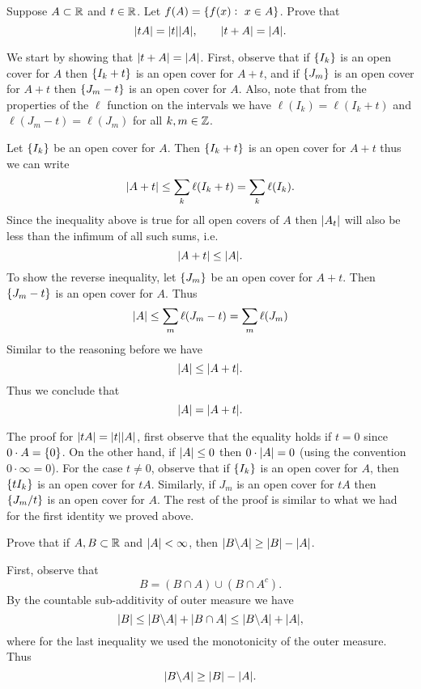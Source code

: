 \begin{problem}
	Suppose $ A \subset\mathbb{R} $ and $ t\in \mathbb{R} $. Let $ f(A) = \{f(x):\ x \in A\} $. Prove that 
	\[ |t A| = |t| |A|, \qquad |t + A| = |A|. \]
\end{problem}
\begin{solution}
	We start by showing that $ |t + A| = |A| $. First, observe that if $ \{I_k\} $ is an open cover for $ A $ then $ \{I_k + t\} $ is an open cover for $ A + t $, and if $ \{J_m\}$ is an open cover for $ A+t $ then $ \{J_m - t\} $ is an open cover for $ A $. Also, note that from the properties of the $ \ell $ function on the intervals we have $ \ell(I_k) = \ell(I_k + t) $ and $ \ell(J_m-t) = \ell(J_m) $ for all $ k,m \in \mathbb{Z} $.
	
	Let $ \{I_k\} $ be an open cover for $ A $. Then $ \{I_k + t\} $ is an open cover for $ A + t $ thus we can write
	\[ |A+t| \leq \sum_k \ell(I_k + t) = \sum_k \ell(I_k). \]
	Since the inequality above is true for all open covers of $ A $ then $ |A_t| $ will also be less than the infimum of all such sums, i.e.
	\[ |A+t| \leq |A|. \] 
	To show the reverse inequality, let $ \{J_m\} $ be an open cover for $ A+t $. Then $ \{J_m-t\}$ is an open cover for $ A $. Thus
	\[ |A| \leq \sum_m \ell(J_m - t) = \sum_m \ell(J_m) \]
	Similar to the reasoning before we have
	\[ |A| \leq |A + t|. \]
	Thus we conclude that 
	\[ |A| = |A +t|. \]
	
	
	The proof for $ |t A| = |t| |A| $, first observe that the equality holds if $ t=0 $ since $ 0 \cdot A = \{0\} $. On the other hand, if $ |A|\leq 0 $ then $ 0 \cdot|A| = 0 $ (using the convention $ 0\cdot\infty=0 $). For the case $ t\neq 0 $, observe that if $ \{I_k\} $ is an open cover for $ A $, then $ \{t I_k\} $ is an open cover for $ t A $. Similarly, if $ J_m $ is an open cover for $ tA $ then $ \{J_m/t\} $ is an open cover for $ A $. The rest of the proof is similar to what we had for the first identity we proved above.
\end{solution}

\begin{problem}
	Prove that if $ A,B \subset \mathbb{R} $ and $ |A| < \infty $, then $ |B \backslash A| \geq |B| - |A| $.
\end{problem}
\begin{solution}
	First, observe that 
	\[ B = (B\cap A) \cup (B\cap A^c). \]
	By the countable sub-additivity of outer measure we have
	\[ |B| \leq |B\backslash A| + |B\cap A| \leq |B\backslash A| + |A|, \]
	where for the last inequality we used the monotonicity of the outer measure. Thus
	\[ |B \backslash A| \geq |B| - |A|. \]
\end{solution}

